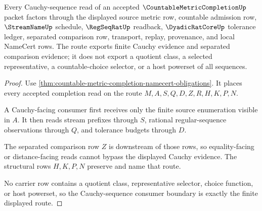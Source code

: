 \begin{theorem}
\label{thm:countable-metric-completion-cauchy-sequence-route}
Every Cauchy-sequence read of an accepted $\CountableMetricCompletionUp$ packet factors through the displayed source metric row, countable admission row, $\StreamNameUp$ schedule, $\RegSeqRatUp$ readback, $\DyadicRatCoreUp$ tolerance ledger, separated comparison row, transport, replay, provenance, and local NameCert rows. The route exports finite Cauchy evidence and separated comparison evidence; it does not export a quotient class, a selected representative, a countable-choice selector, or a host powerset of all sequences.
\end{theorem}
\begin{proof}
Use \autoref{thm:countable-metric-completion-namecert-obligations}. It places every accepted completion read on the route $M,A,S,Q,D,Z,R,H,K,P,N$.

A Cauchy-facing consumer first receives only the finite source enumeration visible in $A$. It then reads stream prefixes through $S$, rational regular-sequence observations through $Q$, and tolerance budgets through $D$.

The separated comparison row $Z$ is downstream of those rows, so equality-facing or distance-facing reads cannot bypass the displayed Cauchy evidence. The structural rows $H,K,P,N$ preserve and name that route.

No carrier row contains a quotient class, representative selector, choice function, or host powerset, so the Cauchy-sequence consumer boundary is exactly the finite displayed route.
\end{proof}

